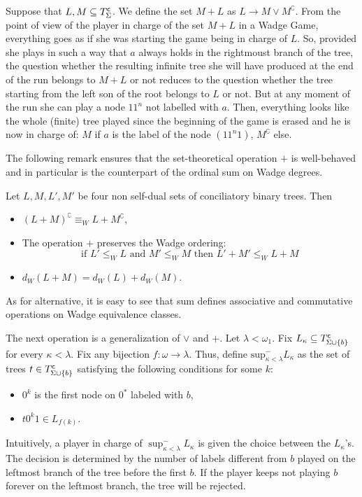\vspace{0.2cm}
 \hspace{0.1cm}
Suppose that $L, M \subseteq T^{\sf c}_{\Sigma} $. We define the set $M+ L$ as $L \to M \lor M^\complement$. 
From the point of view of the player in charge of the set $M+ L$  in a Wadge Game, everything goes as if she was starting the game being in charge of $L$. So, provided she plays in such a way that $a$ always holds in the rightmoust branch of the tree, the question whether the resulting infinite tree she will have produced at the end of the run belongs to $M+ L$  or not reduces to the question whether the tree starting from  the left son of the root belongs to $L$ or not. But at any moment of the run she can play a node $11^n$ not labelled with $a$. Then, everything looks like the whole (finite) tree played since the beginning of the game is erased and he is now in charge of: $M$ if $a$ is the label of the node $(11^n1)$, $M^\complement$ else. 

The following remark ensures that the set-theoretical operation $+$ is well-behaved and in particular is the counterpart of the ordinal sum on Wadge degrees.
\begin{remark}
\label{r_sum}
Let $L, M, L', M'$ be four non self-dual sets of conciliatory binary trees. Then

\begin{itemize}
\item  $ (L + M)^\complement \equiv_W  L+ M^\complement $,
\item The operation $+$ preserves the Wadge ordering: \[ \text{if } L' \leq_W L \text{ and } M' \leq_W M \text{ then } L'+ M' \leq_W L+ M
\]
\item $d_W(L+ M)= d_W(L) + d_W(M)$.
\end{itemize}
\end{remark}
\noindent As for alternative, it is easy to see that sum defines associative and commutative operations on Wadge equivalence classes. 

The next operation is a generalization of $\lor$ and $+$. Let $\lambda < \omega_1$. Fix $L_\kappa \subseteq T^{\sf c}_{\Sigma \cup \{b\}}$
for every $\kappa<\lambda$. Fix any bijection $f: \omega \to \lambda$. Thus, define $\mathrm{sup}^-_{\kappa<\lambda} L_\kappa$ as the set of trees $t
\in  T^{\sf c}_{\Sigma \cup \{b\}}$ satisfying the following conditions for some $k$:
\begin{itemize}
\item $0^k$ is the first node on $0^*$ labeled with $b$,
\item $t0^k1 \in L_{f(k)}$.
\end{itemize}
Intuitively, a player in charge of $\sup^-_{\kappa<\lambda} L_\kappa$ is given the choice
between the $L_\kappa$'s. The decision is determined by the number of labels different from $b$ played on
the leftmost branch of the tree before the first $b$. If the player keeps not
playing $b$  forever on the leftmost branch, the tree will be rejected.  

